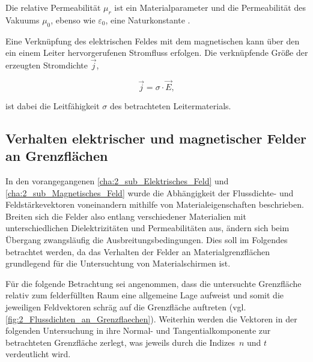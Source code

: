 Die relative Permeabilität $\mu_r$ ist ein Materialparameter und die Permeabilität des Vakuums $\mu_0$, ebenso wie $\varepsilon_0$, eine Naturkonstante \cite{EM_Schirmung}.
\par
\vspace{\linespace}
Eine Verknüpfung des elektrischen Feldes mit dem magnetischen kann über den ein einem Leiter hervorgerufenen Stromfluss erfolgen. Die verknüpfende Größe der erzeugten Stromdichte $\vec j$,

\begin{equation}
    \vec j = \sigma \cdot \vec E,
\end{equation}

ist dabei die Leitfähigkeit $\sigma$ des betrachteten Leitermaterials.


\subsection{Verhalten elektrischer und magnetischer Felder an Grenzflächen}\label{cha:2_sub_Verhalten_an_Grenzflächen}

In den vorangegangenen \Abschnitten \ref{cha:2_sub_Elektrisches_Feld} und \ref{cha:2_sub_Magnetisches_Feld} wurde die Abhängigkeit der Flussdichte- und Feldstärkevektoren voneinandern mithilfe von Materialeigenschaften beschrieben. Breiten sich die Felder also entlang verschiedener Materialien mit unterschiedlichen Dielektrizitäten und Permeabilitäten aus, ändern sich beim Übergang zwangsläufig die Ausbreitungsbedingungen. Dies soll im Folgendes betrachtet werden, da das Verhalten der Felder an Materialgrenzflächen grundlegend für die Untersuchtung von Materialschirmen ist. 
\par
\vspace{\linespace}
Für die folgende Betrachtung sei angenommen, dass die untersuchte Grenzfläche relativ zum felderfüllten Raum eine allgemeine Lage aufweist und somit die jeweiligen Feldvektoren schräg auf die Grenzfläche auftreten (vgl. \Abb \ref{fig:2_Flussdichten_an_Grenzflaechen}). Weiterhin werden die Vektoren in der folgenden Untersuchung in ihre Normal- und Tangentialkomponente zur betrachteten Grenzfläche zerlegt, was jeweils durch die Indizes~$n$ und $t$ verdeutlicht wird. 

